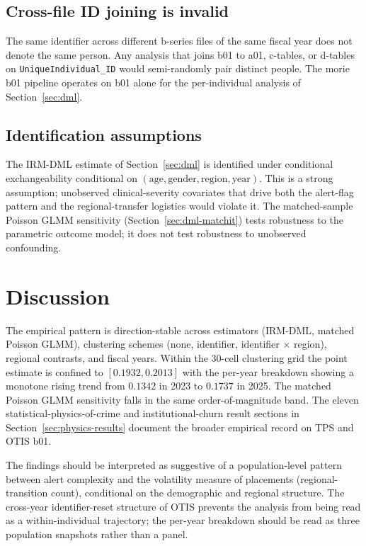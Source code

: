 \documentclass[article,shortnames,nojss]{jss}
\newcommand{\OTIS}{\textsf{OTIS}}
\newcommand{\TPS}{\textsf{TPS}}
\begin{document}
\subsection{Cross-file ID joining is invalid}

The same identifier across different b-series files of the same
fiscal year does not denote the same person. Any analysis that
joins b01 to a01, c-tables, or d-tables on
\texttt{UniqueIndividual\_ID} would semi-randomly pair distinct
people. The morie b01 pipeline operates on b01 alone for the
per-individual analysis of Section~\ref{sec:dml}.

\subsection{Identification assumptions}

The IRM-DML estimate of Section~\ref{sec:dml} is identified under
conditional exchangeability conditional on
$(\mathrm{age}, \mathrm{gender}, \mathrm{region}, \mathrm{year})$.
This is a strong assumption; unobserved clinical-severity covariates
that drive both the alert-flag pattern and the regional-transfer
logistics would violate it. The matched-sample Poisson GLMM
sensitivity (Section~\ref{sec:dml-matchit}) tests robustness to the
parametric outcome model; it does not test robustness to unobserved
confounding.

\section{Discussion}
\label{sec:discussion}

The empirical pattern is direction-stable across estimators
(IRM-DML, matched Poisson GLMM), clustering schemes (none, identifier,
identifier $\times$ region), regional contrasts, and fiscal years.
Within the 30-cell clustering grid the point estimate is confined
to $[0.1932, 0.2013]$ with the per-year breakdown showing a monotone
rising trend from $0.1342$ in 2023 to $0.1737$ in 2025. The matched
Poisson GLMM sensitivity falls in the same order-of-magnitude band.
The eleven statistical-physics-of-crime and institutional-churn
result sections in Section~\ref{sec:physics-results} document the
broader empirical record on \TPS{} and \OTIS{} b01.

The findings should be interpreted as suggestive of a population-level
pattern between alert complexity and the volatility measure of placements (regional-transition count), conditional
on the demographic and regional structure. The cross-year
identifier-reset structure of \OTIS{} prevents the analysis from
being read as a within-individual trajectory; the per-year breakdown
should be read as three population snapshots rather than a panel.
\end{document}
